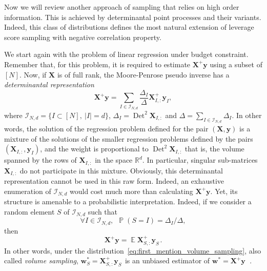 \documentclass[twoside,11pt]{book}
\numberwithin{theorem}{chapter}
\numberwithin{definition}{chapter}
\numberwithin{proposition}{chapter}
\numberwithin{corollary}{chapter}
\numberwithin{example}{chapter}
\numberwithin{lemma}{chapter}
\numberwithin{assumption}{chapter}
\numberwithin{equation}{chapter}
\numberwithin{figure}{chapter}
\DeclareMathOperator{\Det}{Det}
\DeclareMathOperator{\EX}{\mathbb{E}}
\DeclareMathOperator{\Prb}{\mathbb{P}}
\begin{document}
Now we will review another approach of sampling that relies on high order information. This is achieved by determinantal point processes and their variants. Indeed, this class of distributions defines the most natural extension of leverage score sampling with negative correlation property.

We start again with the problem of linear regression under budget constraint. Remember that, for this problem, it is required to estimate $\bm{X}^{+}\bm{y}$ using a subset of $[N]$. Now, if $\bm{X}$ is of full rank, the Moore-Penrose pseudo inverse has a \emph{determinantal representation} \parencite{BeTe90}
\begin{equation}
\bm{X}^{+}\bm{y} = \sum\limits_{I \in \mathcal{I}_{N,d}} \frac{\Delta_{I}}{\Delta} \bm{X}_{I,:}^{+}\bm{y}_{I},
\end{equation}
where $\mathcal{I}_{N,d} = \{ I \subset [N], \:|I| = d \}$, $\Delta_{I} = \Det^{2} \bm{X}_{I,:}$ and $\Delta = \sum_{I \in \mathcal{I}_{N,d}} \Delta_{I}$. In other words, the solution of the regression problem defined for the pair $(\bm{X},\bm{y})$ is a mixture of the solutions of the smaller regression problems defined by the pairs $(\bm{X}_{I,:},\bm{y}_{I})$, and the weight is proportional to $\Det^{2} \bm{X}_{I,:}$ that is, the volume spanned by the rows of $\bm{X}_{I,:}$ in the space $\mathbb{R}^{d}$. In particular, singular sub-matrices $\bm{X}_{I,:}$ do not participate in this mixture. Obviously, this determinantal representation cannot be used in this raw form. Indeed, an exhaustive enumeration of $\mathcal{I}_{N,d}$ would cost much more than calculating $\bm{X}^{+}\bm{y}$. Yet, its structure is amenable to a probabilistic interpretation. Indeed, if we consider a random element $S$ of $\mathcal{I}_{N,d}$ such that
\begin{equation}\label{eq:first_mention_volume_sampling}
\forall I \in \mathcal{I}_{N,d}, \:\: \Prb(S = I) = \Delta_{I}/\Delta,
\end{equation} 
then
\begin{equation}\label{eq:first_mention_unbiasedness}
\bm{X}^{+}\bm{y} = \EX \bm{X}_{S,:}^{+}\bm{y}_{S}^{\phantom{+}}.
\end{equation}
In other words, under the distribution~\eqref{eq:first_mention_volume_sampling}, also called \emph{volume sampling}, $\bm{w}_{S}^{*} = \bm{X}_{S,:}^{+}\bm{y}_{S}^{\phantom{+}}$ is an unbiased estimator of $\bm{w}^{*} = \bm{X}^{+}\bm{y}^{\phantom{+}}$. 
\end{document}
